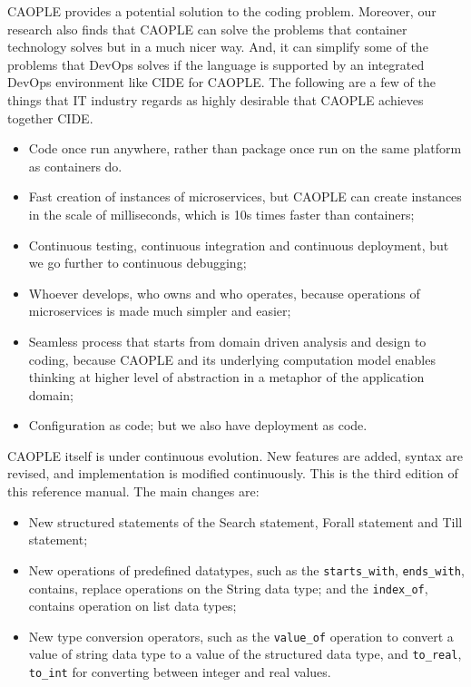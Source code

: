 \documentclass[english]{report}
\begin{document}
CAOPLE provides a potential solution to the coding problem. Moreover, our research also 
finds that CAOPLE can solve the problems that container technology solves but in a much nicer way.
And, it can simplify some of the problems that DevOps solves if the language is supported by an integrated 
DevOps environment like CIDE for CAOPLE. The following are a few of the things that IT industry regards as 
highly desirable that CAOPLE achieves together CIDE.
\begin{itemize}
  \item Code once run anywhere, rather than package once run on the same platform as containers do.
  \item Fast creation of instances of microservices, but CAOPLE can create instances in the scale of 
  milliseconds, which is 10s times faster than containers;
  \item Continuous testing, continuous integration and continuous deployment, but we go further to 
  continuous debugging; 
  \item Whoever develops, who owns and who operates, because operations of microservices is made much 
  simpler and easier; 
  \item Seamless process that starts from domain driven analysis and design to coding, because CAOPLE 
  and its underlying computation model enables thinking at higher level of abstraction in a metaphor 
  of the application domain;
  \item Configuration as code; but we also have deployment as code. 
\end{itemize}

CAOPLE itself is under continuous evolution. New features are added, syntax are revised, and implementation
is modified continuously. This is the third edition of this reference manual. The main changes are: 
\begin{itemize}
  \item New structured statements of the Search statement, Forall statement and Till statement;
  \item New operations of predefined datatypes, such as the \texttt{starts\_with}, \texttt{ends\_with}, contains, replace operations 
  on the String data type; and the \texttt{index\_of}, contains operation on list data types; 
  \item New type conversion operators, such as the \texttt{value\_of} operation to convert a value of string data type to a 
  value of the structured data type, and \texttt{to\_real}, \texttt{to\_int} for converting between integer and real values. 
\end{itemize}
\end{document}
